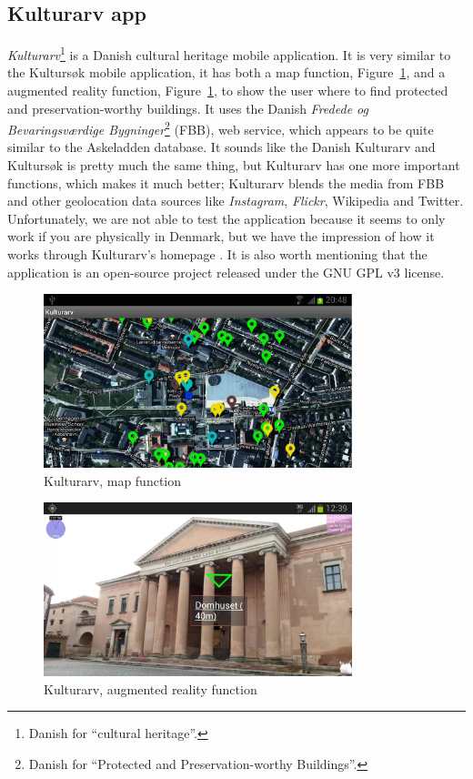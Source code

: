 \documentclass[11pt]{book}
\begin{document}
\subsection{Kulturarv app}
\emph{Kulturarv}\footnote{Danish for ``cultural heritage''.} is a Danish cultural heritage mobile application. It is very similar to the Kultursøk mobile application, it has both a map function, Figure~\ref{fig:pre_kulturArvAppMap}, and a augmented reality function, Figure~\ref{fig:pre_kulturArvAppMap},  to show the user where to find protected and preservation-worthy buildings. It uses the Danish \emph{Fredede og Bevaringsværdige Bygninger}\footnote{Danish for ``Protected and Preservation-worthy Buildings''.} (FBB), web service, which appears to be quite similar to the Askeladden database. It sounds like the Danish Kulturarv and Kultursøk is pretty much the same thing, but Kulturarv has one more important functions, which makes it much better; Kulturarv blends the media from FBB and other geolocation data sources like \emph{Instagram}, \emph{Flickr}, Wikipedia and Twitter. Unfortunately, we are not able to test the application because it seems to only work if you are physically in Denmark, but we have the impression of how it works through Kulturarv's homepage \cite{Kulturarv}. It is also worth  mentioning that the application is an open-source project released under the GNU GPL v3 license. %

\begin{figure}[H]
      \centering
      \includegraphics[width=0.8\textwidth]{Figures/Prestudy/kulturArvMap.png}
      \caption{Kulturarv, map function}
      \label{fig:pre_kulturArvAppMap}
\end{figure}

\begin{figure}[H]
      \centering
      \includegraphics[width=0.8\textwidth]{Figures/Prestudy/kulturArvAR1.png}
      \caption{Kulturarv, augmented reality function}
      \label{fig:pre_kulturArvAppAug}
\end{figure}
\end{document}
